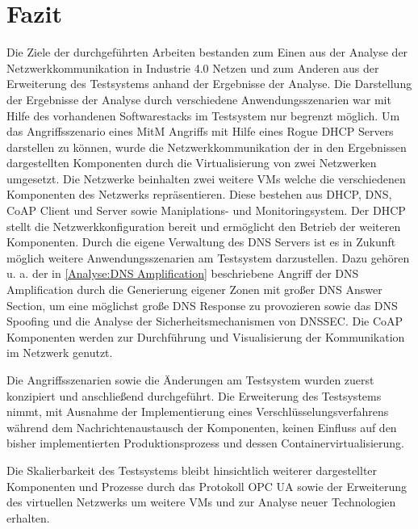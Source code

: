 \chapter{Fazit}
\label{Fazit}
Die Ziele der durchgeführten Arbeiten bestanden zum Einen aus der Analyse der Netzwerkkommunikation in Industrie 4.0 Netzen und zum Anderen aus der Erweiterung des Testsystems anhand der Ergebnisse der Analyse. Die Darstellung der Ergebnisse der Analyse durch verschiedene Anwendungsszenarien war mit Hilfe des vorhandenen Softwarestacks im Testsystem nur  begrenzt möglich. Um das Angriffsszenario eines \ac{MitM} Angriffs mit Hilfe eines Rogue \ac{DHCP} Servers darstellen zu können, wurde die Netzwerkkommunikation der in den Ergebnissen dargestellten Komponenten durch die Virtualisierung von zwei Netzwerken umgesetzt. Die Netzwerke beinhalten zwei weitere \ac{VM}s welche die verschiedenen Komponenten des Netzwerks repräsentieren. Diese bestehen aus \ac{DHCP}, \ac{DNS}, \ac{CoAP} Client und Server sowie Maniplations- und Monitoringsystem. Der \ac{DHCP} stellt die Netzwerkkonfiguration bereit und ermöglicht den Betrieb der weiteren Komponenten. Durch die eigene Verwaltung des \ac{DNS} Servers ist es in Zukunft möglich weitere Anwendungsszenarien am Testsystem darzustellen. Dazu gehören u. a. der in \autoref{Analyse:DNS Amplification} beschriebene Angriff der \ac{DNS} Amplification durch die Generierung eigener Zonen mit großer \ac{DNS} Answer Section, um eine möglichst große \ac{DNS} Response zu provozieren sowie das \ac{DNS} Spoofing und die Analyse der Sicherheitsmechanismen von \ac{DNSSEC}. Die \ac{CoAP} Komponenten werden zur Durchführung und Visualisierung der Kommunikation im Netzwerk genutzt.

Die Angriffsszenarien sowie die Änderungen am Testsystem wurden zuerst konzipiert und anschließend durchgeführt. Die Erweiterung des Testsystems nimmt, mit Ausnahme der Implementierung eines Verschlüsselungsverfahrens während dem Nachrichtenaustausch der Komponenten, keinen Einfluss auf den bisher implementierten Produktionsprozess und dessen Containervirtualisierung. 

Die Skalierbarkeit des Testsystems bleibt hinsichtlich weiterer dargestellter Komponenten und Prozesse durch das Protokoll \ac{OPC UA} sowie der Erweiterung des virtuellen Netzwerks um weitere \ac{VM}s und zur Analyse neuer Technologien erhalten. 

